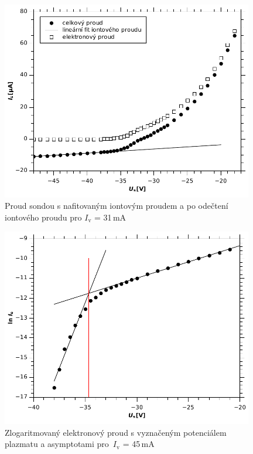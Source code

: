 \documentclass[12pt]{article}
\begin{document}
\begin{figure}[htbp]
\begin{center}
\includegraphics[width=11cm]{proudiv31.pdf}
\caption{Proud sondou s nafitovaným iontovým proudem a po odečtení iontového proudu pro $I_\mathrm{v}$ = 31\,mA}
\label{iv31}
\end{center}
\end{figure}

\begin{figure}[htbp]
\begin{center}
\includegraphics[width=11cm]{ln45.pdf}
\caption{Zlogaritmovaný elektronový proud s vyznačeným potenciálem plazmatu a asymptotami pro~$I_\mathrm{v}$ = 45\,mA}
\label{ln45}
\end{center}
\end{figure}
\end{document}
